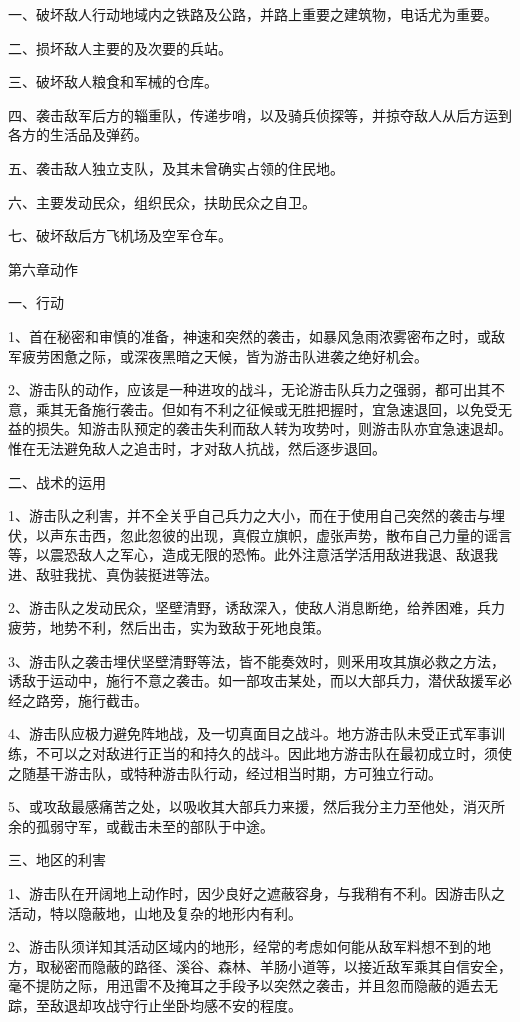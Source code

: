 一、破坏敌人行动地域内之铁路及公路，并路上重要之建筑物，电话尤为重要。

二、损坏敌人主要的及次要的兵站。

三、破坏敌人粮食和军械的仓库。

四、袭击敌军后方的辎重队，传递步哨，以及骑兵侦探等，并掠夺敌人从后方运到各方的生活品及弹药。

五、袭击敌人独立支队，及其未曾确实占领的住民地。

六、主要发动民众，组织民众，扶助民众之自卫。

七、破坏敌后方飞机场及空军仓车。

第六章动作

一、行动

1、首在秘密和审慎的准备，神速和突然的袭击，如暴风急雨浓雾密布之时，或敌军疲劳困惫之际，或深夜黑暗之天候，皆为游击队进袭之绝好机会。

2、游击队的动作，应该是一种进攻的战斗，无论游击队兵力之强弱，都可出其不意，乘其无备施行袭击。但如有不利之征候或无胜把握时，宜急速退回，以免受无益的损失。知游击队预定的袭击失利而敌人转为攻势吋，则游击队亦宜急速退却。惟在无法避免敌人之追击时，才对敌人抗战，然后逐步退回。

二、战术的运用

1、游击队之利害，并不全关乎自己兵力之大小，而在于使用自己突然的袭击与埋伏，以声东击西，忽此忽彼的出现，真假立旗帜，虚张声势，散布自己力量的谣言等，以震恐敌人之军心，造成无限的恐怖。此外注意活学活用敌进我退、敌退我进、敌驻我扰、真伪装挺进等法。

2、游击队之发动民众，坚壁清野，诱敌深入，使敌人消息断绝，给养困难，兵力疲劳，地势不利，然后出击，实为致敌于死地良策。

3、游击队之袭击埋伏坚壁清野等法，皆不能奏效时，则釆用攻其旗必救之方法，诱敌于运动中，施行不意之袭击。如一部攻击某处，而以大部兵力，潜伏敌援军必经之路旁，施行截击。

4、游击队应极力避免阵地战，及一切真面目之战斗。地方游击队未受正式军事训练，不可以之对敌进行正当的和持久的战斗。因此地方游击队在最初成立时，须使之随基干游击队，或特种游击队行动，经过相当时期，方可独立行动。

5、或攻敌最感痛苦之处，以吸收其大部兵力来援，然后我分主力至他处，消灭所余的孤弱守军，或截击未至的部队于中途。

三、地区的利害

1、游击队在开阔地上动作时，因少良好之遮蔽容身，与我稍有不利。因游击队之活动，特以隐蔽地，山地及复杂的地形内有利。

2、游击队须详知其活动区域内的地形，经常的考虑如何能从敌军料想不到的地方，取秘密而隐蔽的路径、溪谷、森林、羊肠小道等，以接近敌军乘其自信安全，毫不提防之际，用迅雷不及掩耳之手段予以突然之袭击，并且忽而隐蔽的遁去无踪，至敌退却攻战守行止坐卧均感不安的程度。

